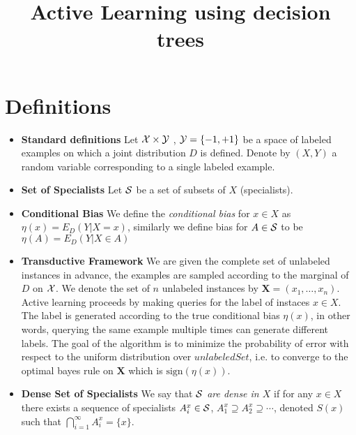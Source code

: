 \documentclass{article}
\title{Active Learning using decision trees}
\begin{document}
\maketitle

\section{Definitions}

\newcommand{\specialists}{{\cal S}}
\newcommand{\unlabeledSet}{{\mathbf X}}

\begin{itemize}
  \item {\bf Standard definitions}
Let ${\cal X} \times {\cal Y}$ , ${\cal Y} = \{-1,+1\}$ be a space of
labeled examples on which a joint distribution $D$ is defined. Denote
by $(X,Y)$ a random variable corresponding to a single labeled
example.

\item
{\bf Set of Specialists}
Let $\specialists$ be a set of subsets of $X$ (specialists).

\item {\bf Conditional Bias}
We define the {\em conditional bias} for $x \in X$ as $\eta(x) = E_D(Y |
X=x)$, similarly we define bias for $A \in \specialists$ to be $\eta(A) = E_D(Y |
X \in A)$

\newcommand{\sign}{\mbox{sign}}
\item {\bf Transductive Framework} We are given the complete set of
  unlabeled instances in advance, the examples are sampled according
  to the marginal of $D$ on ${\cal X}$. We denote the set of $n$
  unlabeled instances by $\unlabeledSet = (x_1,\ldots,x_n)$. Active
  learning proceeds by making queries for the label of instaces
  $x \in X$. The label is generated according to the true conditional
  bias $\eta(x)$, in other words, querying the same example multiple
  times can generate different labels. The goal of the algorithm is to
  minimize the probability of error with respect to the uniform
  distribution over $unlabeledSet$, i.e. to converge to the optimal
  bayes rule on $\unlabeledSet$ which is $\sign(\eta(x))$.

\item {\bf Dense Set of Specialists} We say that {\em $\specialists$
    are dense in $X$} if for any $x \in X$ there exists a sequence of
  specialists $A_i^x \in \specialists$,
  $A_1^x \supseteq A_2^x \supseteq \cdots$, denoted $S(x)$ such that
  $\bigcap_{i=1}^{\infty} A_i^x = \{x\}$.


\end{itemize}
\end{document}
